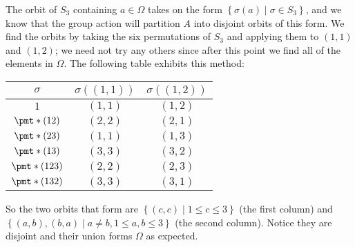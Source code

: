 \documentclass[11pt]{article}
\newcommand{\cbr}[1]{\left\{#1\right\}}
\begin{document}
\begin{enumerate}
    The orbit of $S_3$ containing $a\in \Omega$ takes on the form $\cbr{\sigma(a)\mid \sigma\in S_3}$, and we know that the group action will partition $A$ into disjoint orbits of this form. We find the orbits by taking the six permutations of $S_3$ and applying them to $(1,1)$ and $(1,2)$; we need not try any others since after this point we find all of the elements in $\Omega$. The following table exhibits this method:
    \begin{center}
        \begin{tabular}{ c|c|c }
         $\sigma$ & $\sigma((1,1))$ & $\sigma((1,2))$ \\
         \hline 
         $1$ & $(1,1)$ & $(1,2)$ \\
         $\pmt*{(12)}$ & $(2,2)$ & $(2,1)$ \\
         $\pmt*{(23)}$ & $(1,1)$ & $(1,3)$ \\
         $\pmt*{(13)}$ & $(3,3)$ & $(3,2)$ \\
         $\pmt*{(123)}$ & $(2,2)$ & $(2,3)$ \\
         $\pmt*{(132)}$ & $(3,3)$ & $(3,1)$
        \end{tabular}
    \end{center}
    So the two orbits that form are $\cbr{(c,c)\mid 1\leq c \leq 3}$ (the first column) and $\cbr{(a,b),(b,a)\mid a\neq b, 1\leq a,b\leq 3}$ (the second column). Notice they are disjoint and their union forms $\Omega$ as expected.


\end{enumerate}
\end{document}
